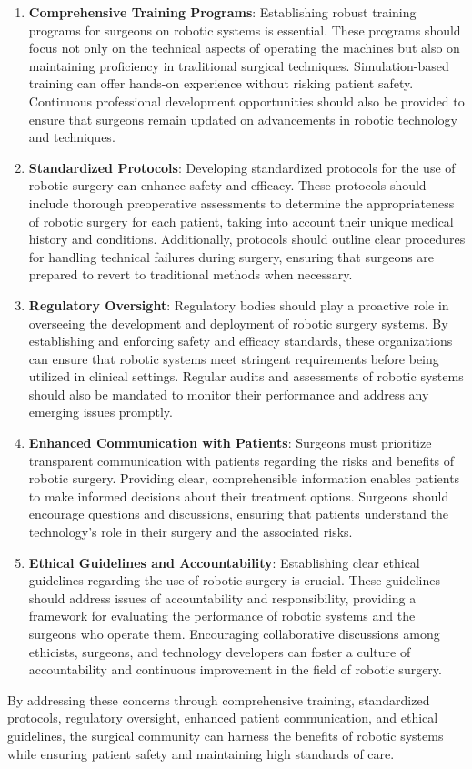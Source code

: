\begin{enumerate}
    \item \textbf{Comprehensive Training Programs}: Establishing robust training programs for surgeons on robotic systems is essential. These programs should focus not only on the technical aspects of operating the machines but also on maintaining proficiency in traditional surgical techniques. Simulation-based training can offer hands-on experience without risking patient safety. Continuous professional development opportunities should also be provided to ensure that surgeons remain updated on advancements in robotic technology and techniques.

    \item \textbf{Standardized Protocols}: Developing standardized protocols for the use of robotic surgery can enhance safety and efficacy. These protocols should include thorough preoperative assessments to determine the appropriateness of robotic surgery for each patient, taking into account their unique medical history and conditions. Additionally, protocols should outline clear procedures for handling technical failures during surgery, ensuring that surgeons are prepared to revert to traditional methods when necessary.

    \item \textbf{Regulatory Oversight}: Regulatory bodies should play a proactive role in overseeing the development and deployment of robotic surgery systems. By establishing and enforcing safety and efficacy standards, these organizations can ensure that robotic systems meet stringent requirements before being utilized in clinical settings. Regular audits and assessments of robotic systems should also be mandated to monitor their performance and address any emerging issues promptly.

    \item \textbf{Enhanced Communication with Patients}: Surgeons must prioritize transparent communication with patients regarding the risks and benefits of robotic surgery. Providing clear, comprehensible information enables patients to make informed decisions about their treatment options. Surgeons should encourage questions and discussions, ensuring that patients understand the technology's role in their surgery and the associated risks.

    \item \textbf{Ethical Guidelines and Accountability}: Establishing clear ethical guidelines regarding the use of robotic surgery is crucial. These guidelines should address issues of accountability and responsibility, providing a framework for evaluating the performance of robotic systems and the surgeons who operate them. Encouraging collaborative discussions among ethicists, surgeons, and technology developers can foster a culture of accountability and continuous improvement in the field of robotic surgery.
\end{enumerate}

By addressing these concerns through comprehensive training, standardized protocols, regulatory oversight, enhanced patient communication, and ethical guidelines, the surgical community can harness the benefits of robotic systems while ensuring patient safety and maintaining high standards of care.


